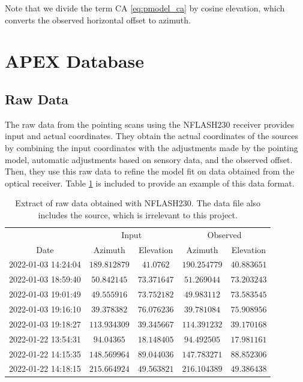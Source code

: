 Note that we divide the term CA \eqref{eq:pmodel_ca} by cosine elevation, which converts the observed horizontal offset to azimuth.

\section{APEX Database} \label{sec:database}


\subsection{Raw Data}
The raw data from the pointing scans using the NFLASH230 receiver provides input and actual coordinates.
They obtain the actual coordinates of the sources by combining the input coordinates with the adjustments made by the pointing model,
automatic adjustments based on sensory data, and the observed offset.
Then, they use this raw data to refine the model fit on data obtained from the optical receiver.
Table \ref{tab:raw_datanflash230} is included to provide an example of this data format. 


\begin{table}[h]
    \centering
    \caption[Raw NFLASH230 data]{Extract of raw data obtained with NFLASH230. The data file also includes the source, which is irrelevant to this project.}
    \begin{tabular}{ccccc}
        \toprule
         & \multicolumn{2}{c}{Input} & \multicolumn{2}{c}{Observed} \\ 
        \cline{2-3} \cline{4-5}
        Date & Azimuth & Elevation & Azimuth & Elevation \\ 
        \hline
        2022-01-03 14:24:04 & $189.812879$ & $41.0762$ & $190.254779$ & $40.883651$ \\
        2022-01-03 18:59:40 & $50.842145$ & $73.371647$ & $51.269044$ & $73.203243$ \\
        2022-01-03 19:01:49 & $49.555916$ & $73.752182$ & $49.983112$ & $73.583545$ \\
        2022-01-03 19:16:10 & $39.378382$ & $76.076236$ & $39.781084$ & $75.908956$ \\
        2022-01-03 19:18:27 & $113.934309$ & $39.345667$ & $114.391232$ & $39.170168$ \\
        2022-01-22 13:54:31 & $94.04365$ & $18.148405$ & $94.492505$ & $17.981161$ \\
        2022-01-22 14:15:35 & $148.569964$ & $89.044036$ & $147.783271$ & $88.852306$ \\
        2022-01-22 14:18:15 & $215.664924$ & $49.563821$ & $216.104389$ & $49.386438$ \\
        \bottomrule
    \end{tabular}
    \label{tab:raw_datanflash230}
    \end{table}



